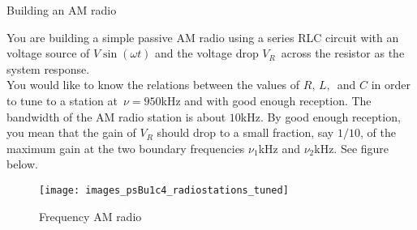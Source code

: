 \begin{homework}
  Building an AM radio
\end{homework}

You are building a simple passive AM radio using a series RLC circuit
with an voltage source of $V \sin⁡(\omega t)$
and the voltage drop $V_R\,$ across the resistor as the system response.\\

You would like to know the relations between the values of $R,\,L,\,$ and $C$
in order to tune to a station at $\, \nu =950$kHz and with good enough reception.
The bandwidth of the AM radio station is about $10$kHz.
By good enough reception, you mean that the gain of $V_R$ should drop to a small fraction,
say $1/10$, of the maximum gain at the two boundary frequencies $\nu _ 1$kHz and $\nu_ 2$kHz.
See figure below.

\begin{figure}[ht!]
  \centering
  \texttt{[image: images\_psBu1c4\_radiostations\_tuned]}
  \caption{Frequency AM radio}
\end{figure}

